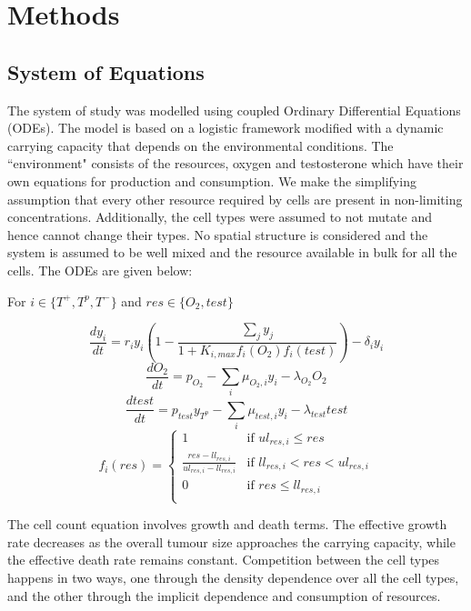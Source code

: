 \chapter{Methods}

\section{System of Equations}
The system of study was modelled using coupled Ordinary Differential Equations (ODEs). The model is based on a logistic framework modified with a dynamic carrying capacity that depends on the environmental conditions. The ``environment" consists of the resources, oxygen and testosterone which have their own equations for production and consumption. We make the simplifying assumption that every other resource required by cells are present in non-limiting concentrations. Additionally, the cell types were assumed to not mutate and hence cannot change their types. No spatial structure is considered and the system is assumed to be well mixed and the resource available in bulk for all the cells. The ODEs are given below:

For $i \in \{T^+,T^p,T^-\}$ and $res \in \{O_2,test\}$

\begin{equation}
  \frac{dy_i}{dt} = r_i y_i (1 - \frac{\sum_j y_j}{1 + K_{i,max} f_i(O_2) f_i(test)} )- \delta_i y_i
  \label{celleq}
\end{equation}
\begin{equation}
  \frac{dO_2}{dt} = p_{O_2} - \sum_i \mu_{O_2,i} y_i - \lambda_{O_2} O_2
  \label{o2eq}
\end{equation}
\begin{equation}
  \frac{dtest}{dt} = p_{test} y_{T^p} - \sum_i \mu_{test,i} y_i - \lambda_{test} test
  \label{testeq}
\end{equation}
\begin{equation}
  f_i(res) = \begin{cases}
    1 &\text{if } ul_{res,i} \leq res\\
    \frac{res-ll_{res,i}}{ul_{res,i}-ll_{res,i}} &\text{if } ll_{res,i} < res < ul_{res,i}\\
    0 &\text{if } res \leq ll_{res,i}\\
  \end{cases}
  \label{freseq}
\end{equation}

The cell count equation involves growth and death terms. The effective growth rate decreases as the overall tumour size approaches the carrying capacity, while the effective death rate remains constant. Competition between the cell types happens in two ways, one through the density dependence over all the cell types, and the other through the implicit dependence and consumption of resources.

